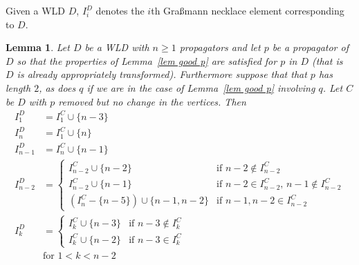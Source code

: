 \documentclass[11pt]{article}
\newtheorem{lem}[thm]{Lemma}
\theoremstyle{remark}
\theoremstyle{definition}
\begin{document}
Given a WLD $D$, $I_i^{D}$ denotes the $i$th Gra\ss mann necklace element corresponding to $D$.

\begin{lem}\label{lem I}
  Let $D$ be a WLD with $n\geq 1$ propagators and let $p$ be a propagator of $D$ so that the properties of Lemma~\ref{lem good p} are satisfied for $p$ in $D$ (that is $D$ is already appropriately transformed).  Furthermore suppose that that $p$ has length $2$, as does $q$ if we are in the case of Lemma~\ref{lem good p} involving $q$.  Let $C$ be $D$ with $p$ removed but no change in the vertices.  Then
  \begin{align*}
    I_1^{D} & = I_1^{C} \cup \{n-3\} \\
    I_n^{D} & = I_1^{C} \cup \{n\} \\
    I_{n-1}^{D} & = I_n^{C} \cup \{n-1\} \\
    I_{n-2}^{D} & =
    \begin{cases}
      I_{n-2}^{C}\cup \{n-2\} & \text{if $n-2\not\in I_{n-2}^{C}$} \\
      I_{n-2}^{C}\cup \{n-1\} & \text{if $n-2\in I_{n-2}^{C}$, $n-1\not\in I_{n-2}^{C}$} \\
      (I_{n}^{C} - \{n-5\})\cup \{n-1,n-2\} & \text{if $n-1, n-2\in I_{n-2}^{C}$}
    \end{cases} \\
    I_{k}^{D} & =
    \begin{cases}
      I_k^{C}\cup \{n-3\} & \text{if $n-3 \not\in I_k^{C}$}\\
      I_k^{C}\cup\{n-2\} & \text{if $n-3\in I_k^{C}$}
    \end{cases} \\
    & \text{for $1<k<n-2$}
  \end{align*}
\end{lem}
\end{document}

